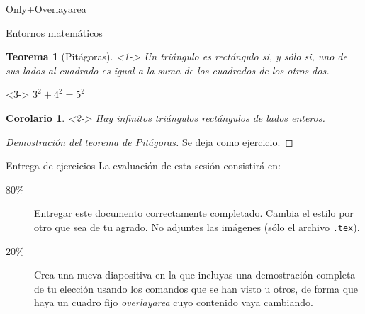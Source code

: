 \documentclass{beamer}
\newtheorem*{teor}{Teorema}
\newtheorem*{coro}{Corolario}
\begin{document}
\begin{frame}{Only+Overlayarea}
\begin{overlayarea}{\textwidth}{2cm}
    \end{overlayarea}
\end{frame}

\begin{frame}{Entornos matemáticos}
\begin{teor}[Pitágoras]<1-> \label{pitagoras}
Un triángulo es rectángulo si, y sólo si, uno de sus lados al cuadrado es igual a la suma de los cuadrados de los otros dos.
\end{teor}


\begin{example}<3->
$3^2+4^2=5^2$
\end{example}

\begin{coro}<2->
Hay infinitos triángulos rectángulos de lados enteros.
\end{coro}
\end{frame}

\begin{frame}\label{dem}
    \begin{proof}[Demostración del teorema de Pitágoras]
    Se deja como ejercicio.
    \end{proof}
    
    \hyperlink{pitagoras}{}
\end{frame}

\begin{frame}{Entrega de ejercicios}
La evaluación de esta sesión consistirá en:
\begin{description}
   \item[80\%] Entregar este documento correctamente completado. Cambia el estilo por otro que sea de tu agrado. No adjuntes las imágenes (sólo el archivo \texttt{.tex}).
   \item[20\%] Crea una nueva diapositiva en la que incluyas una demostración completa de tu elección usando los comandos que se han visto u otros, de forma que haya un cuadro fijo \emph{overlayarea} cuyo contenido vaya cambiando.
 \end{description}
\end{frame}
\end{document}
